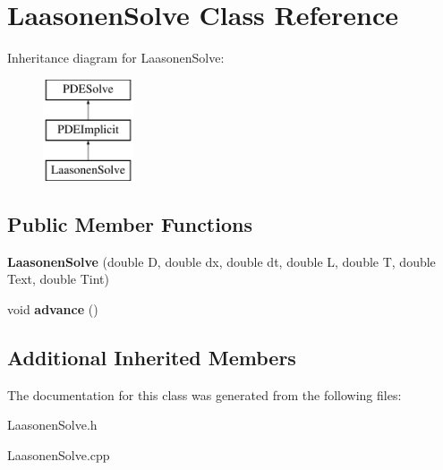 \hypertarget{class_laasonen_solve}{}\section{Laasonen\+Solve Class Reference}
\label{class_laasonen_solve}
Inheritance diagram for Laasonen\+Solve\+:\begin{figure}[H]
\begin{center}
\leavevmode
\includegraphics[height=3.000000cm]{class_laasonen_solve}
\end{center}
\end{figure}
\subsection*{Public Member Functions}
\begin{DoxyCompactItemize}
\item 
\mbox{\label{class_laasonen_solve_afee5334bc58eaf72c312d73ff3e8829c}} 
{\bfseries Laasonen\+Solve} (double D, double dx, double dt, double L, double T, double Text, double Tint)
\item 
\mbox{\label{class_laasonen_solve_af320ccb100c388621052d2a2cb57858a}} 
void {\bfseries advance} ()
\end{DoxyCompactItemize}
\subsection*{Additional Inherited Members}


The documentation for this class was generated from the following files\+:\begin{DoxyCompactItemize}
\item 
Laasonen\+Solve.\+h\item 
Laasonen\+Solve.\+cpp\end{DoxyCompactItemize}
